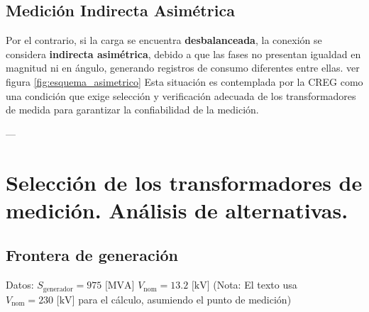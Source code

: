 \subsection{Medición Indirecta Asimétrica}

Por el contrario, si la carga se encuentra \textbf{desbalanceada}, la conexión se considera \textbf{indirecta asimétrica}, debido a que las fases no presentan igualdad en magnitud ni en ángulo, generando registros de consumo diferentes entre ellas. ver figura \ref{fig:esquema_asimetrico} Esta situación es contemplada por la CREG como una condición que exige selección y verificación adecuada de los transformadores de medida para garantizar la confiabilidad de la medición.





---
\section{Selección de los transformadores de medición. Análisis de alternativas.}

\subsection{Frontera de generación}
Datos:
$S_{\text{generador}} = 975 \text{ [MVA]}$
$V_{\text{nom}} = 13.2 \text{ [kV]}$ (Nota: El texto usa $V_{\text{nom}} = 230 \text{ [kV]}$ para el cálculo, asumiendo el punto de medición)

